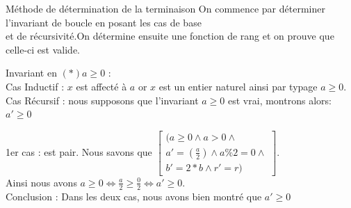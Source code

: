 \documentclass[12pt,a4paper]{report}
\begin{document}
\begin{mybox}{Méthode de détermination de la terminaison}
On commence par déterminer l'invariant de boucle en posant les cas de base \\
et de récursivité.On détermine ensuite une fonction de rang et on prouve que celle-ci est valide.

\end{mybox}
\begin{flushleft}
Invariant en  $ (*) a\geq 0 $  : \\

Cas Inductif :  $x$ est affect\'{e} \`{a} $a$ or $x$ est un entier naturel ainsi par typage $a\ge 0$.\\

Cas Récursif : nous supposons que l’invariant  $a\ge 0$ est vrai, montrons alors: $ a' \geq 0 $ \medskip

1er cas :  est pair. Nous savons que $\left[ \begin{array}{c}(a\ge 0\wedge a>0\wedge \\
   a '=(\frac{a}{2})\wedge a\%2=0 \wedge \\
b '=2*b\wedge r '=r)\end{array}
\right]$.\\ 
Ainsi nous avons $a\ge 0\Leftrightarrow \frac{a}{2}\ge \frac{0}{2}\Leftrightarrow a ' \ge 0$.\\

Conclusion : Dans les deux cas, nous avons bien montré que $ a' \geq 0$
\end{flushleft}
 
\end{document}
